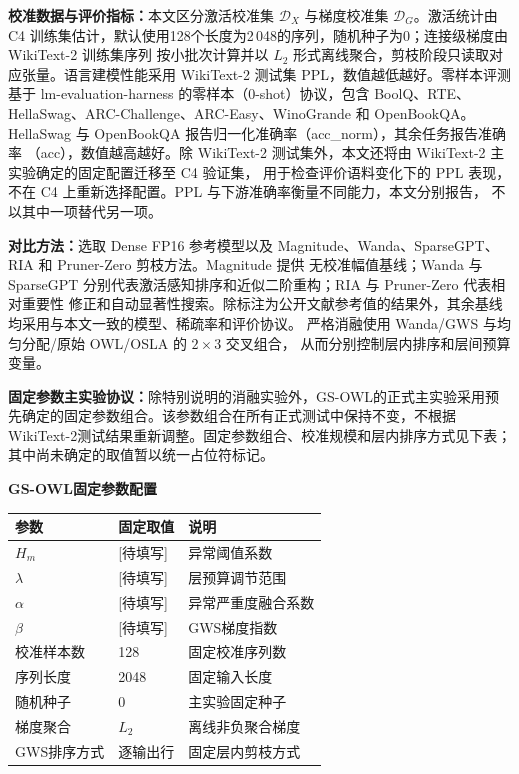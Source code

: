 \documentclass[UTF8,fontset=fandol]{ctexart}
\renewcommand{\arraystretch}{1.08}
\begin{document}
\textbf{校准数据与评价指标：}本文区分激活校准集 $\mathcal D_X$ 与梯度校准集 $\mathcal D_G$。激活统计由
C4\cite{c4} 训练集估计，默认使用128个长度为2\,048的序列，随机种子为0；连接级梯度由 WikiText-2 训练集序列
按小批次计算并以 $L_2$ 形式离线聚合，剪枝阶段只读取对应张量。语言建模性能采用
WikiText-2\cite{wikitext} 测试集 PPL，数值越低越好。零样本评测基于 lm-evaluation-harness 的零样本（0-shot）协议，包含
BoolQ\cite{boolq}、RTE\cite{glue}、HellaSwag\cite{hellaswag}、ARC-Challenge、ARC-Easy\cite{arc}、WinoGrande\cite{winogrande}
和 OpenBookQA\cite{openbookqa}。HellaSwag 与 OpenBookQA 报告归一化准确率（acc\_norm），其余任务报告准确率
（acc），数值越高越好。除 WikiText-2 测试集外，本文还将由 WikiText-2 主实验确定的固定配置迁移至 C4 验证集，
用于检查评价语料变化下的 PPL 表现，不在 C4 上重新选择配置。PPL 与下游准确率衡量不同能力，本文分别报告，
不以其中一项替代另一项。

\textbf{对比方法：}选取 Dense FP16 参考模型以及 Magnitude、Wanda、SparseGPT、RIA 和 Pruner-Zero 剪枝方法。Magnitude 提供
无校准幅值基线；Wanda 与 SparseGPT 分别代表激活感知排序和近似二阶重构；RIA 与 Pruner-Zero 代表相对重要性
修正和自动显著性搜索。除标注为公开文献参考值的结果外，其余基线均采用与本文一致的模型、稀疏率和评价协议。
严格消融使用 Wanda/GWS 与均匀分配/原始 OWL/OSLA 的 $2\times3$ 交叉组合，
从而分别控制层内排序和层间预算变量。

\textbf{固定参数主实验协议：}除特别说明的消融实验外，GS-OWL的正式主实验采用预先确定的固定参数组合。该参数组合在所有正式测试中保持不变，不根据WikiText-2测试结果重新调整。固定参数组合、校准规模和层内排序方式见下表；其中尚未确定的取值暂以统一占位符标记。

\begin{table}[!htbp]
\centering
\textbf{GS-OWL固定参数配置}\par\vspace{2pt}
\scriptsize
\setlength{\tabcolsep}{5.0pt}
\renewcommand{\arraystretch}{1.02}
\begin{tabular}{lll}
\toprule
参数 & 固定取值 & 说明 \\
\midrule
$H_m$ & [待填写] & 异常阈值系数 \\
$\lambda$ & [待填写] & 层预算调节范围 \\
$\alpha$ & [待填写] & 异常严重度融合系数 \\
$\beta$ & [待填写] & GWS梯度指数 \\
校准样本数 & 128 & 固定校准序列数 \\
序列长度 & 2048 & 固定输入长度 \\
随机种子 & 0 & 主实验固定种子 \\
梯度聚合 & $L_2$ & 离线非负聚合梯度 \\
GWS排序方式 & 逐输出行 & 固定层内剪枝方式 \\
\bottomrule
\end{tabular}
\end{table}
\end{document}

